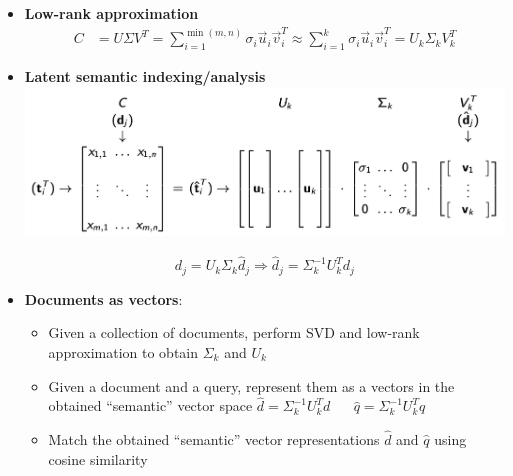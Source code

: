 \begin{enumerate}
\begin{itemize}
        \item \textbf{Low-rank approximation}
        $$
        \begin{aligned}
        C &=U \Sigma V^{T}=\sum_{i=1}^{\min (m, n)} \sigma_{i} \vec{u}_{i} \vec{v}_{i}^{T} 
         \approx \sum_{i=1}^{k} \sigma_{i} \vec{u}_{i} \vec{v}_{i}^{T}=U_{k} \Sigma_{k} V_{k}^{T}
        \end{aligned}
        $$
        \item \textbf{Latent semantic indexing/analysis} \\
        \includegraphics[scale=0.6]{figures/lsa.png}
        
        $$ d_{j}=U_{k} \Sigma_{k} \hat{d}_{j} \Longrightarrow \hat{d}_{j}=\Sigma_{k}^{-1} U_{k}^{T} d_{j} $$
        
        \item \textbf{Documents as vectors}:
        \begin{itemize}
            \item Given a collection of documents, perform SVD and low-rank approximation to obtain $\Sigma_k$ and $U_k$
            \item Given a document and a query, represent them as a vectors in the obtained “semantic” vector space \;\;
            $
            \hat{d}=\Sigma_{k}^{-1} U_{k}^{T} d \;\;\;\;\;\;
            \hat{q}=\Sigma_{k}^{-1} U_{k}^{T} q
            $
            \item Match the obtained “semantic” vector representations $\hat{d}$ and $\hat{q}$ using cosine similarity
        \end{itemize}
        

\end{itemize}
\end{enumerate}
